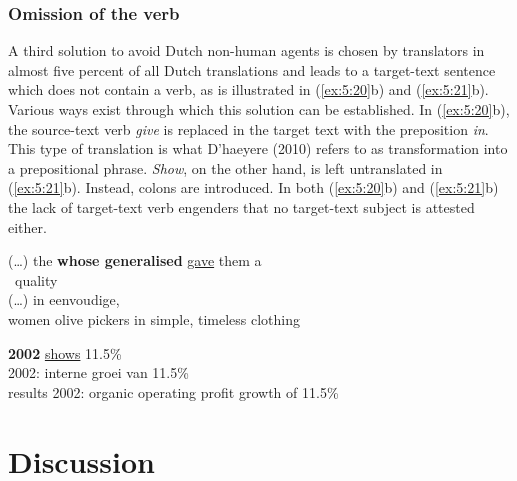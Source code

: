 \documentclass[output=paper]{LSP/langsci}
\begin{document}
\subsubsection{Omission of the verb} \label{sec:5:6:2:3}

A third solution to avoid Dutch non-human agents is chosen by translators in almost five percent of all Dutch translations and leads to a target-text sentence which does not contain a verb, as is illustrated in (\ref{ex:5:20}b) and (\ref{ex:5:21}b). Various ways exist through which this solution can be established. In (\ref{ex:5:20}b), the source-text verb \textit{give} is replaced in the target text with the preposition \textit{in}. This type of translation is what D’haeyere (2010) refers to as transformation into a prepositional phrase. \textit{Show}, on the other hand, is left untranslated in (\ref{ex:5:21}b). Instead, colons are introduced. In both (\ref{ex:5:20}b) and (\ref{ex:5:21}b) the lack of target-text verb engenders that no target-text subject is attested either.     


\ea \label{ex:5:20} 
\ea
(\dots) the  \textbf{whose generalised}  \ul{gave} them a \\\, quality\\[1em]
\ex
(\dots)  in eenvoudige,  \\
women olive pickers in simple, timeless clothing
\z
\z


\ea \label{ex:5:21}
\ea
\textbf{2002}  \ul{shows} 11.5\% \\[1em]
\ex {} 2002: interne groei  van 11.5\%\\
results 2002: organic operating profit growth of 11.5\%
\z
\z




\section{Discussion}
\end{document}
